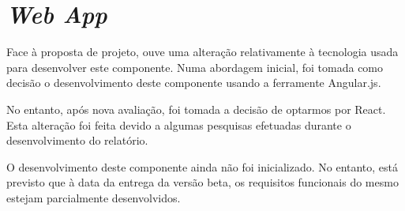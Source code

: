 \section{\textit{Web App}}
Face à proposta de projeto, ouve uma alteração relativamente à tecnologia usada para desenvolver este componente. Numa abordagem inicial, foi tomada como decisão o desenvolvimento deste componente usando a ferramente Angular.js. \par \medskip

No entanto, após nova avaliação, foi tomada a decisão de optarmos por React. Esta alteração foi feita devido a algumas pesquisas efetuadas durante o desenvolvimento do relatório. \par \medskip

O desenvolvimento deste componente ainda não foi inicializado. No entanto, está previsto que à data da entrega da versão beta, os requisitos funcionais do mesmo estejam parcialmente desenvolvidos.